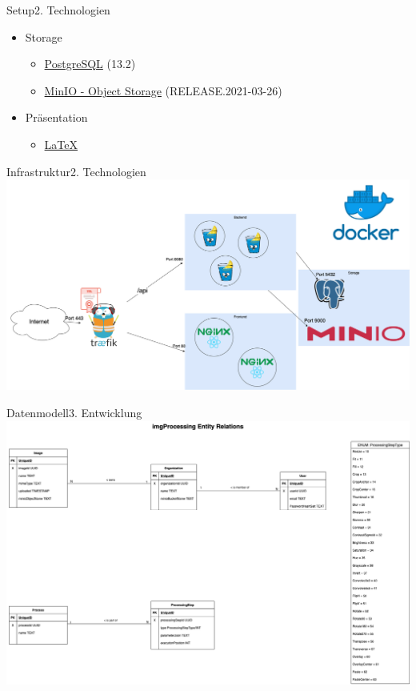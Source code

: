 \documentclass[aspectratio=169,20pt]{beamer}
\begin{document}
\begin{frame}{Setup}{2. Technologien}
\begin{itemize}
		\begin{itemize}
			\item{\href{https://traefik.io/}{Traefik} (2.4.8)}
		\end{itemize} 
		\item{Storage}
		\begin{itemize}
			\item{\href{https://www.postgresql.org/}{PostgreSQL} (13.2)}
			\item{\href{https://min.io/}{MinIO - Object Storage} (RELEASE.2021-03-26)}
		\end{itemize}
		\item{Präsentation}
		\begin{itemize}
			\item{\href{https://github.com/ost-fh/Latex-Beamer-Theme}{LaTeX}}
		\end{itemize}       
	\end{itemize}
		
\end{frame}




\begin{frame}{Infrastruktur}{2. Technologien}
	\includegraphics[scale=0.45]{Infrastruktur}	
\end{frame}

\begin{frame}{Datenmodell}{3. Entwicklung}
	\includegraphics[scale=0.40]{db_model}	
\end{frame}
\end{document}
